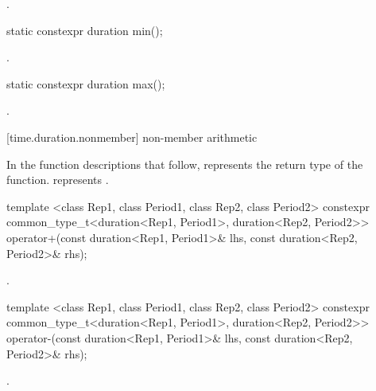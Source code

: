 \begin{itemdescr}
\pnum
\returns {}.
\end{itemdescr}

%
\begin{itemdecl}
static constexpr duration min();
\end{itemdecl}

\begin{itemdescr}
\pnum
\returns {}.
\end{itemdescr}

%
\begin{itemdecl}
static constexpr duration max();
\end{itemdecl}

\begin{itemdescr}
\pnum
\returns {}.
\end{itemdescr}

[time.duration.nonmember]{ non-member arithmetic}

\pnum
In the function descriptions that follow,  represents the return type
of the function.  represents .

%
\begin{itemdecl}
template <class Rep1, class Period1, class Rep2, class Period2>
  constexpr common_type_t<duration<Rep1, Period1>, duration<Rep2, Period2>>
  operator+(const duration<Rep1, Period1>& lhs, const duration<Rep2, Period2>& rhs);
\end{itemdecl}

\begin{itemdescr}
\pnum
\returns {}.
\end{itemdescr}

%
\begin{itemdecl}
template <class Rep1, class Period1, class Rep2, class Period2>
  constexpr common_type_t<duration<Rep1, Period1>, duration<Rep2, Period2>>
  operator-(const duration<Rep1, Period1>& lhs, const duration<Rep2, Period2>& rhs);
\end{itemdecl}

\begin{itemdescr}
\pnum
\returns {}.
\end{itemdescr}

